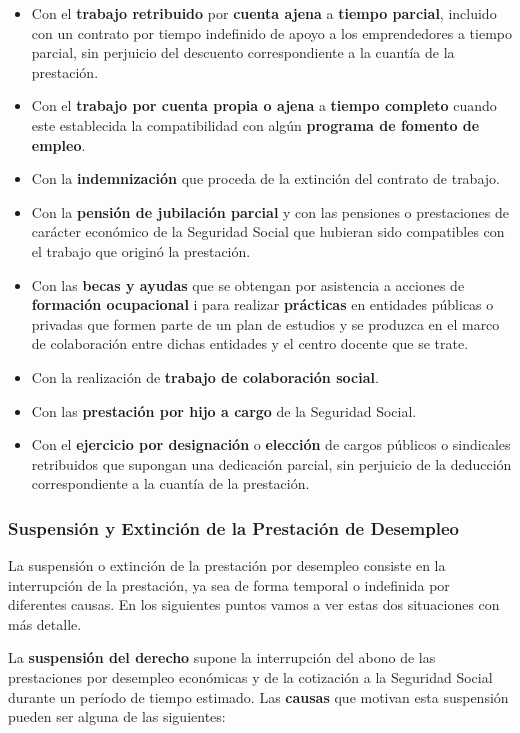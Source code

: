 \begin{itemize}
    \item Con el \textbf{trabajo retribuido} por \textbf{cuenta ajena} a \textbf{tiempo parcial}, incluido con un contrato por tiempo indefinido de apoyo a los emprendedores a tiempo parcial, sin perjuicio del descuento correspondiente a la cuantía de la prestación.
    \item Con el \textbf{trabajo por cuenta propia o ajena} a \textbf{tiempo completo} cuando este establecida la compatibilidad con algún \textbf{programa de fomento de empleo}.
    \item Con la \textbf{indemnización} que proceda de la extinción del contrato de trabajo.
    \item Con la \textbf{pensión de jubilación parcial} y con las pensiones o prestaciones de carácter económico de la Seguridad Social que hubieran sido compatibles con el trabajo que originó la prestación.
    \item Con las \textbf{becas y ayudas} que se obtengan por asistencia a acciones de \textbf{formación ocupacional} i para realizar \textbf{prácticas} en entidades públicas o privadas que formen parte de un plan de estudios y se produzca en el marco de colaboración entre dichas entidades y el centro docente que se trate.
    \item Con la realización de \textbf{trabajo de colaboración social}.
    \item Con las \textbf{prestación por hijo a cargo} de la Seguridad Social.
    \item Con el \textbf{ejercicio por designación} o \textbf{elección} de cargos públicos o sindicales retribuidos que supongan una dedicación parcial, sin perjuicio de la deducción correspondiente a la cuantía de la prestación.
\end{itemize}

\subsubsection{Suspensión y Extinción de la Prestación de Desempleo}
La suspensión o extinción de la prestación por desempleo consiste en la interrupción de la prestación, ya sea de forma temporal o indefinida por diferentes causas. En los siguientes puntos vamos a ver estas dos situaciones con más detalle.

La \textbf{suspensión del derecho} supone la interrupción del abono de las prestaciones por desempleo económicas y de la cotización a la Seguridad Social durante un período de tiempo estimado. Las \textbf{causas} que motivan esta suspensión pueden ser alguna de las siguientes:


